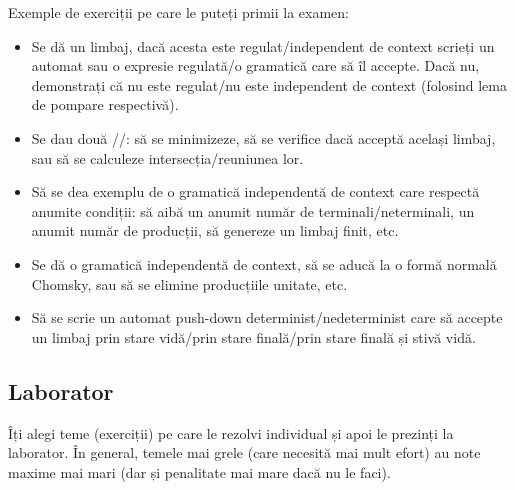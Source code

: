 Exemple de exerciții pe care le puteți primii la examen:
\begin{itemize}
    \item Se dă un limbaj, dacă acesta este regulat/independent de context scrieți un automat sau o expresie regulată/o gramatică care să îl accepte.
          Dacă nu, demonstrați că nu este regulat/nu este independent de context (folosind lema de pompare respectivă).

    \item Se dau două \dfa/\nfa/\lnfa: să se minimizeze, să se verifice dacă acceptă același limbaj, sau să se calculeze intersecția/reuniunea lor.

    \item Să se dea exemplu de o gramatică independentă de context care respectă anumite condiții: să aibă un anumit număr de terminali/neterminali, un anumit număr de producții, să genereze un limbaj finit, etc.

    \item Se dă o gramatică independentă de context, să se aducă la o formă normală Chomsky, sau să se elimine producțiile unitate, etc.

    \item Să se scrie un automat push-down determinist/nedeterminist care să accepte un limbaj prin stare vidă/prin stare finală/prin stare finală și stivă vidă.
\end{itemize}

\subsection*{Laborator}

Îți alegi teme (exerciții) pe care le rezolvi individual și apoi le prezinți la laborator. În general, temele mai grele (care necesită mai mult efort) au note maxime mai mari (dar și penalitate mai mare dacă nu le faci).
